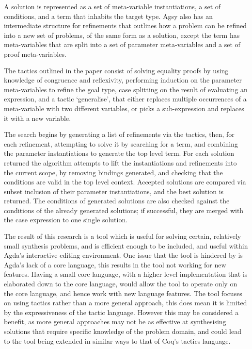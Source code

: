 \documentclass[a4paper]{article}
\begin{document}
A solution is represented as a set of meta-variable instantiations, a
set of conditions, and a term that inhabits the target type. Agsy also
has an intermediate structure for refinements that outlines how a 
problem can be refined into a new set of problems, of the same form as
a solution, except the term has meta-variables that are split into a 
set of parameter meta-variables and a set of proof meta-variables.

The tactics outlined in the paper consist of solving equality proofs by
using knowledge of congruence and reflexivity, performing induction on
the parameter meta-variables to refine the goal type, case splitting on
the result of evaluating an expression, and a tactic `generalise', that
either replaces multiple occurrences of a meta-variable with two 
different variables, or picks a sub-expression and replaces it with a
new variable. 

The search begins by generating a list of refinements via the tactics,
then, for each refinement, attempting to solve it by searching for a 
term, and combining the parameter instantiations to generate the top
level term. For each solution returned the algorithm attempts to lift 
the instantiations and refinements into the current scope, by removing
bindings generated, and checking that the conditions are valid in the
top level context. Accepted solutions are compared via subset inclusion
of their parameter instantiations, and the best solution is returned. 
The conditions of generated solutions are also checked against the 
conditions of the already generated solutions; if successful,
they are merged with the case expression to one single solution. 

The result of this research is a tool which is useful for solving 
certain, relatively small synthesis problems, and is efficient 
enough to be included, and useful within Agda's interactive editing
environment. One issue that the tool is hindered by is Agda's lack of 
a core language, this results in the tool not working for new features.
Having a small core language, with a higher level implementation that 
is elaborated down to the core language, would allow the tool to 
operate only on the core language, and hence work with new language 
features. The tool focuses on using tactics rather than a more general 
approach, this does mean it is limited by the expressiveness of the 
tactic language. However this may be considered a benefit, 
as more general approaches may not be as effective at synthesising 
solutions that require specific knowledge of the problem domain, and 
could lead to the tool being extended in similar ways to that of Coq's
tactics language. 
\end{document}
